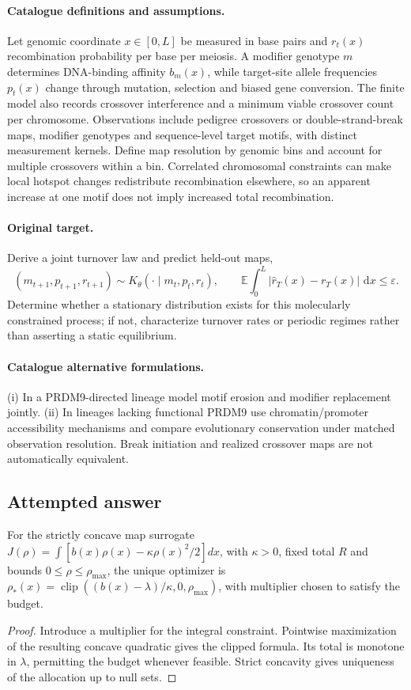 \documentclass[11pt]{article}
\begin{document}
\paragraph{Catalogue definitions and assumptions.}
Let genomic coordinate $x\in[0,L]$ be measured in base pairs and $r_t(x)$ recombination probability per base per meiosis. A modifier genotype $m$ determines DNA-binding affinity $b_m(x)$, while target-site allele frequencies $p_t(x)$ change through mutation, selection and biased gene conversion. The finite model also records crossover interference and a minimum viable crossover count per chromosome. Observations include pedigree crossovers or double-strand-break maps, modifier genotypes and sequence-level target motifs, with distinct measurement kernels. Define map resolution by genomic bins and account for multiple crossovers within a bin. Correlated chromosomal constraints can make local hotspot changes redistribute recombination elsewhere, so an apparent increase at one motif does not imply increased total recombination.
\paragraph{Original target.}
Derive a joint turnover law and predict held-out maps,
\[
 (m_{t+1},p_{t+1},r_{t+1})\sim
 K_\theta(\cdot\mid m_t,p_t,r_t),\qquad
 \mathbb{E}\!\int_0^L|\widehat r_T(x)-r_T(x)|\,\,\mathrm{d} x\le\varepsilon.
\]
Determine whether a stationary distribution exists for this molecularly constrained process; if not, characterize turnover rates or periodic regimes rather than asserting a static equilibrium.
\paragraph{Catalogue alternative formulations.}
(i) In a PRDM9-directed lineage model motif erosion and modifier replacement jointly. (ii) In lineages lacking functional PRDM9 use chromatin/promoter accessibility mechanisms and compare evolutionary conservation under matched observation resolution. Break initiation and realized crossover maps are not automatically equivalent.
\subsection{Attempted answer}
\begin{proposition}
For the strictly concave map surrogate $J(\rho)=\int[b(x)\rho(x)-\kappa\rho(x)^2/2]dx$, with $\kappa>0$, fixed total $R$ and bounds $0\leq\rho\leq\rho_{\max}$, the unique optimizer is $\rho_*(x)=\operatorname{clip}((b(x)-\lambda)/\kappa,0,\rho_{\max})$, with multiplier chosen to satisfy the budget.
\end{proposition}
\begin{proof}
Introduce a multiplier for the integral constraint. Pointwise maximization of the resulting concave quadratic gives the clipped formula. Its total is monotone in $\lambda$, permitting the budget whenever feasible. Strict concavity gives uniqueness of the allocation up to null sets.
\end{proof}
\end{document}
